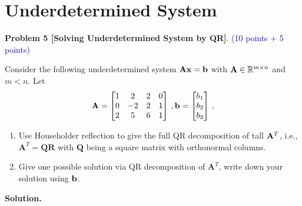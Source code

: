 \documentclass[english,onecolumn]{IEEEtran}
\def\Q{\mathbf{Q}}
\def\A{\mathbf{A}}
\def\R{\mathbf{R}}
\begin{document}
\newpage
\section{Underdetermined System}

\noindent\textbf{Problem 5 [Solving Underdetermined System by QR]}. \textcolor{blue}{(10 points + 5 points)}

Consider the following underdetermined system ${\bf Ax}={\bf b}$ with ${\bf A}\in \mathbb{R}^{m\times n}$ and $m<n$. Let 
    \[
    {\bf A}=
    \begin{bmatrix}
         1&2&2&0\\
         0&-2&2&1\\
         2&5&6&1
    \end{bmatrix}\,,
    {\bf b}=
    \begin{bmatrix}
        b_1\\b_2\\b_3
    \end{bmatrix}\,,
    \]
\begin{enumerate}
    \item Use Householder reflection to give the full QR decomposition of tall ${\bf A}^T$, i.e., $\A^T= \Q\R$ with $\Q$ being a square matrix with orthonormal columns.
    \item Give one possible solution via QR decomposition of $\A^T$, write down your solution using $\bf{b}$.
\end{enumerate}
\noindent
\textbf{Solution.}
\end{document}

